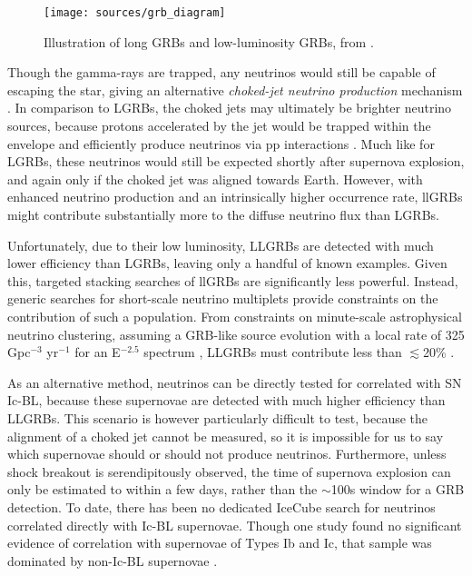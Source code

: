 \begin{figure}[!ht]
	\centering \texttt{[image: sources/grb\_diagram]}
	\caption{Illustration of long GRBs and low-luminosity GRBs, from \cite{nakar_15_llgrb}.}
	\label{fig:grb_diagram}
\end{figure}

Though the gamma-rays are trapped, any neutrinos would still be capable of escaping the star, giving an alternative \emph{choked-jet neutrino production} mechanism . In comparison to LGRBs, the choked jets may ultimately be brighter neutrino sources, because protons accelerated by the jet would be trapped within the envelope and efficiently produce neutrinos via pp interactions \cite{nakar_15_llgrb}. Much like for LGRBs, these neutrinos would still be expected shortly after supernova explosion, and again only if the choked jet was aligned towards Earth. However, with enhanced neutrino production and an intrinsically higher occurrence rate, llGRBs might contribute substantially more to the diffuse neutrino flux than LGRBs. 

Unfortunately, due to their low luminosity, LLGRBs are detected with much lower efficiency than LGRBs, leaving only a handful of known examples. Given this, targeted stacking searches of llGRBs are significantly less powerful. Instead, generic searches for short-scale neutrino multiplets provide constraints on the contribution of such a population. From constraints on minute-scale astrophysical neutrino clustering, assuming a GRB-like source evolution with a local rate of 325 Gpc$^{-3}$ yr$^{-1}$ for an E$^{-2.5}$ spectrum \cite{07_llgrb}, LLGRBs must contribute less than $\lesssim$20\% .

As an alternative method, neutrinos can be directly tested for correlated with SN Ic-BL, because these supernovae are detected with much higher efficiency than LLGRBs. This scenario is however particularly difficult to test, because the alignment of a choked jet cannot be measured, so it is impossible for us to say which supernovae should or should not produce neutrinos. Furthermore, unless shock breakout is serendipitously observed, the time of supernova explosion can only be estimated to within a few days, rather than the $\sim$100s window for a GRB detection. To date, there has been no dedicated IceCube search for neutrinos correlated directly with Ic-BL supernovae. Though one study found no significant evidence of correlation with supernovae of Types Ib and Ic, that sample was dominated by non-Ic-BL supernovae \cite{Stasik2018Search}. 

